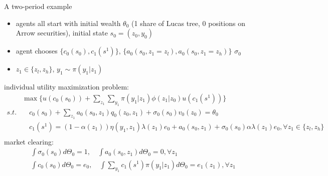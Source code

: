 \documentclass[9pt]{beamer}
\theoremstyle{mystyle}
\begin{document}
\begin{frame}{A two-period example}
\begin{itemize}
\item agents all start with initial wealth $\theta_0$ (1 share of Lucas tree, 0 positions on Arrow securities), initial state $s_0 = (z_0, y_0)$
\vspace{2mm}
\item agent chooses $\{c_0(s_0), c_1(s^1) \}$, $\{ a_0(s_0, z_1=z_l), a_0(s_0, z_1=z_h)\}$ $\sigma_0$
\vspace{2mm}
\item $z_1\in\{z_l,z_h\}$, $y_1\sim \pi(y_1|z_1)$
\end{itemize}
\vspace{2mm}
individual utility maximization problem:
\begin{equation*}
\begin{split}
&\max\Bigg\{ u(c_0(s_0)) + \sum_{z_1}\sum_{y_1}\pi(y_1|z_1)\phi(z_1|z_0)u(c_1(s^1)) \Bigg\}\\
s.t.& \quad c_0(s_0) + \sum_{z_1}a_0(s_0,z_1)q_0(z_0,z_1) + \sigma_0(s_0)v_0(z_0) = \theta_0\\
& \quad c_1(s^1)=(1-\alpha(z_1))\eta(y_1,z_1)\lambda(z_1)e_0+a_0(s_0,z_1)+\sigma_0(s_0)\alpha \lambda(z_1)e_0, \forall z_1\in\{z_l, z_h\}\\
\end{split}
\end{equation*}
market clearing: 
\begin{equation*}
\begin{split}
&\int\sigma_0(s_0)d\Theta_0 = 1, \quad \int a_0(s_0,z_1)d\Theta_0 = 0, \forall z_1 \\
&\int c_0(s_0)d\Theta_0 = e_0, \quad \int\sum_{y_1}c_1(s^1)\pi(y_1|z_1)d\Theta_0 = e_1(z_1), \forall z_1
\end{split}
\end{equation*}
\end{frame}
\end{document}

